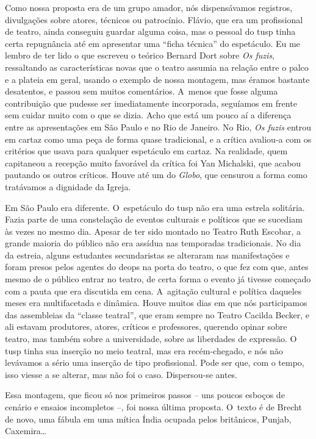 {Como nossa proposta era de um grupo amador, nós dispensávamos registros,
divulgações sobre atores, técnicos ou patrocínio. Flávio, que era um
profissional de teatro, ainda conseguiu guardar alguma coisa, mas o
pessoal do {\sc tusp} tinha certa repugnância até em apresentar uma “ficha
técnica” do espetáculo. Eu me lembro de ter lido o que escreveu o
teórico Bernard Dort sobre {\it Os fuzis}, ressaltando as características
novas que o teatro assumia na relação entre o palco e a plateia em
geral, usando o exemplo de nossa montagem, mas éramos bastante
desatentos, e passou sem muitos comentários. A~menos que fosse alguma
contribuição que pudesse ser imediatamente incorporada, seguíamos em
frente sem cuidar muito com o que se dizia. Acho que está um pouco aí a
diferença entre as apresentações em São Paulo e no Rio de Janeiro. No
Rio, {\it Os fuzis} entrou em cartaz como uma peça de forma quase
tradicional, e a crítica avaliou-a com os critérios que usava para qualquer
espetáculo em cartaz. Na realidade, quem capitaneou a recepção muito
favorável da crítica foi Yan Michalski, que acabou pautando os outros
críticos. Houve até um do {\it Globo}, que censurou a forma como tratávamos
a dignidade da Igreja.

Em São Paulo era diferente. O~espetáculo do {\sc tusp} não era uma estrela
solitária. Fazia parte de uma constelação de eventos culturais e
políticos que se sucediam às vezes no mesmo dia. Apesar de ter sido
montado no Teatro Ruth Escobar, a grande maioria do público não era
assídua nas temporadas tradicionais. No dia da estreia, alguns estudantes
secundaristas se alteraram nas manifestações e foram presos pelos
agentes do {\sc deops} na porta do teatro, o que fez com que, antes mesmo de o
público entrar no teatro, de certa forma o evento já tivesse começado
com a pauta que era discutida em cena. A~agitação cultural e política
daqueles meses era multifacetada e dinâmica. Houve muitos dias em que
nós participamos das assembleias da “classe teatral”, que eram sempre no
Teatro Cacilda Becker, e ali estavam produtores, atores, críticos e
professores, querendo opinar sobre teatro, mas também sobre a
universidade, sobre as liberdades de expressão. O {\sc tusp} tinha sua
inserção no meio teatral, mas era recém-chegado, e nós não levávamos a
sério uma inserção de tipo profissional. Pode ser que, com o tempo, isso
viesse a se alterar, mas não foi o caso. Dispersou-se antes.

\subject{A montagem truncada de “Mann ist Mann”}

Essa montagem, que ficou só nos primeiros passos -- uns poucos esboços de
cenário e ensaios incompletos --, foi nossa última proposta. O~texto é de
Brecht de novo, uma fábula em uma mítica Índia ocupada pelos britânicos,
Punjab, Caxemira\ldots{}

}
